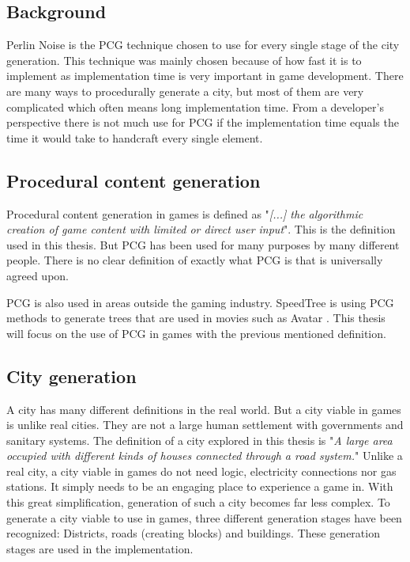 	\subsection{Background}
	Perlin Noise is the PCG technique chosen to use for every single stage of the city generation. This technique was mainly chosen because of how fast it is to implement as implementation time is very important in game development.
	There are many ways to procedurally generate a city, but most of them are very complicated which often means long implementation time. From a developer's perspective there is not much use for PCG if the implementation time equals the time it would take to handcraft every single element.
	
	\subsection{Procedural content generation}
	Procedural content generation in games is defined as "\textit{[...] the algorithmic creation of game content with limited or direct user input}"\cite{WhatIsPCG}. This is the definition used in this thesis. But PCG has been used for many purposes by many different people. There is no clear definition of exactly what PCG is that is universally agreed upon.\cite{WhatIsPCG}
	
	PCG is also used in areas outside the gaming industry. SpeedTree \cite{SpeedTree} is using PCG methods to generate trees that are used in movies such as Avatar \cite{SpeedTreeMovies}.
	This thesis will focus on the use of PCG in games with the previous mentioned definition.
	
	\subsection{City generation}
	A city has many different definitions in the real world. But a city viable in games is unlike real cities. They are not a large human settlement with governments and sanitary systems. The definition of a city explored in this thesis is "\textit{A large area occupied with different kinds of houses connected through a road system.}"
	Unlike a real city, a city viable in games do not need logic, electricity connections nor gas stations. It simply needs to be an engaging place to experience a game in. With this great simplification, generation of such a city becomes far less complex.
	To generate a city viable to use in games, three different generation stages have been recognized: Districts, roads (creating blocks) and buildings. These generation stages are used in the implementation.
	
